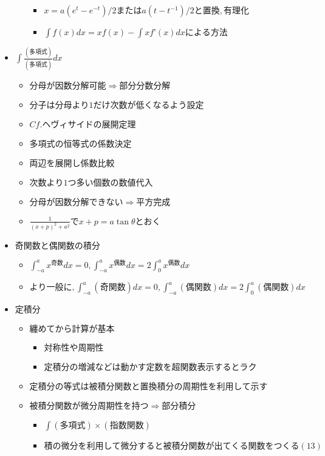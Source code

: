 \documentclass[dvipdfmx,uplatex]{jsarticle}
\begin{document}
\begin{itemize}
\begin{itemize}
		\begin{itemize}
			\item $  x = a(e^t - e^{-t})/2 または a(t - t^{-1})/2 と置換,有理化$
			\item $ \int f(x)dx = xf(x) - \int xf’(x)dx による方法$
		\end{itemize}
	\end{itemize}
	\item $ \int \frac{(多項式)}{(多項式)}dx$
	\begin{itemize}
		\item $ 分母が因数分解可能⇒部分分数分解$
		\item $  分子は分母より1だけ次数が低くなるよう設定$
		\item $ Cf. ヘヴィサイドの展開定理$
		\item $ 多項式の恒等式の係数決定$
		\item $ 両辺を展開し係数比較$
		\item $ 次数より1つ多い個数の数値代入$
		\item $ 分母が因数分解できない⇒平方完成$
		\item $ \frac{1}{(x + p)^2 + a^2} で x + p = a \tan \theta とおく$
	\end{itemize}
	\item $ 奇関数と偶関数の積分$
	\begin{itemize}
		\item $ \int^a_{-a} x^{奇数}dx = 0, \int^a_{-a} x^{偶数}dx = 2\int^a_0 x^{偶数}dx$
		\item $ より一般に, \int^a_{-a} (奇関数)dx = 0, \int^a_{-a} (偶関数)dx = 2\int^a_{0} (偶関数)dx$
	\end{itemize}
	\item $ 定積分$
	\begin{itemize}
		\item $ 纏めてから計算が基本$
		\begin{itemize}
			\item $ 対称性や周期性$
			\item $ 定積分の増減などは動かす定数を超関数表示するとラク$
		\end{itemize}
		\item $ 定積分の等式は被積分関数と置換積分の周期性を利用して示す$
		\item $ 被積分関数が微分周期性を持つ⇒部分積分$
		\begin{itemize}
			\item $ \int (多項式) \times (指数関数)$
			\item $ 積の微分を利用して微分すると被積分関数が出てくる関数をつくる(13)$

\end{itemize}
\end{itemize}
\end{itemize}
\end{document}
